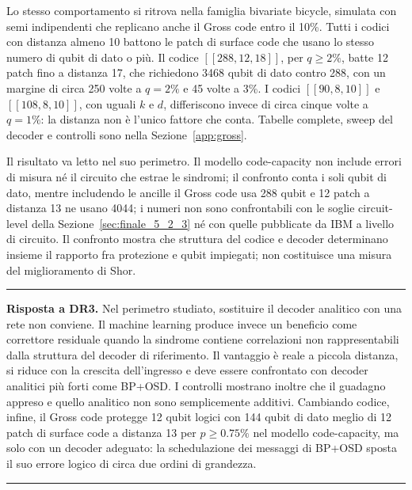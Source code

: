 Lo stesso comportamento si ritrova nella famiglia bivariate bicycle, simulata con semi indipendenti che replicano anche il Gross code entro il 10\%. Tutti i codici con distanza almeno 10 battono le patch di surface code che usano lo stesso numero di qubit di dato o più. Il codice \ensuremath{[[288,12,18]]}, per \(q \ge 2\%\), batte 12 patch fino a distanza 17, che richiedono 3468 qubit di dato contro 288, con un margine di circa 250 volte a \(q = 2\%\) e 45 volte a 3\%. I codici \ensuremath{[[90,8,10]]} e \ensuremath{[[108,8,10]]}, con uguali \(k\) e \(d\), differiscono invece di circa cinque volte a \(q = 1\%\): la distanza non è l'unico fattore che conta. Tabelle complete, sweep del decoder e controlli sono nella Sezione~\ref{app:gross}.

Il risultato va letto nel suo perimetro. Il modello code-capacity non include errori di misura né il circuito che estrae le sindromi; il confronto conta i soli qubit di dato, mentre includendo le ancille il Gross code usa 288 qubit e 12 patch a distanza 13 ne usano 4044; i numeri non sono confrontabili con le soglie circuit-level della Sezione~\ref{sec:finale_5_2_3} né con quelle pubblicate da IBM a livello di circuito. Il confronto mostra che struttura del codice e decoder determinano insieme il rapporto fra protezione e qubit impiegati; non costituisce una misura del miglioramento di Shor.

\clearpage
\par\medskip\noindent\rule{\linewidth}{0.6pt}\par\nopagebreak
{\small{}\noindent \textbf{Risposta a DR3.} Nel perimetro studiato, sostituire il decoder analitico con una rete non conviene. Il machine learning produce invece un beneficio come correttore residuale quando la sindrome contiene correlazioni non rappresentabili dalla struttura del decoder di riferimento. Il vantaggio è reale a piccola distanza, si riduce con la crescita dell'ingresso e deve essere confrontato con decoder analitici più forti come BP+OSD. I controlli mostrano inoltre che il guadagno appreso e quello analitico non sono semplicemente additivi. Cambiando codice, infine, il Gross code protegge 12 qubit logici con 144 qubit di dato meglio di 12 patch di surface code a distanza 13 per \(p \ge 0.75\%\) nel modello code-capacity, ma solo con un decoder adeguato: la schedulazione dei messaggi di BP+OSD sposta il suo errore logico di circa due ordini di grandezza.\par}
\nopagebreak\noindent\rule{\linewidth}{0.6pt}\par\medskip

